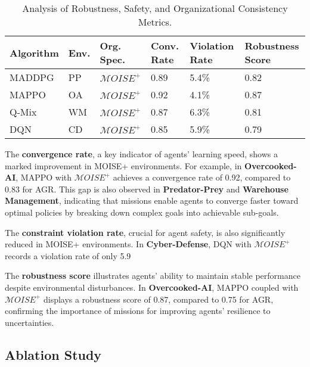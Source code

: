 \documentclass[sigconf,anonymous]{aamas}
\begin{document}
\begin{table}[h!]
    \centering
    \caption{Analysis of Robustness, Safety, and Organizational Consistency Metrics.}
    \label{tab:other_metrics}
    \small %
    \renewcommand{\arraystretch}{1.1}
    \begin{tabular}{p{1.2cm}p{0.5cm}p{1.1cm}p{0.5cm}p{1.4cm}p{1.4cm}}
        \hline
        \textbf{Algorithm} & \textbf{Env.} & \textbf{Org. Spec.} & \textbf{Conv. Rate} & \textbf{Violation Rate} & \textbf{Robustness Score} \\ \hline
        MADDPG & PP & $\mathcal{M}OISE^+$ & 0.89 & 5.4\% & 0.82 \\
        MAPPO & OA & $\mathcal{M}OISE^+$ & 0.92 & 4.1\% & 0.87 \\
        Q-Mix & WM & $\mathcal{M}OISE^+$ & 0.87 & 6.3\% & 0.81 \\
        DQN & CD & $\mathcal{M}OISE^+$ & 0.85 & 5.9\% & 0.79 \\
    \end{tabular}
\end{table}

The \textbf{convergence rate}, a key indicator of agents' learning speed, shows a marked improvement in MOISE+ environments. For example, in \textbf{Overcooked-AI}, MAPPO with $\mathcal{M}OISE^+$ achieves a convergence rate of 0.92, compared to 0.83 for AGR. This gap is also observed in \textbf{Predator-Prey} and \textbf{Warehouse Management}, indicating that missions enable agents to converge faster toward optimal policies by breaking down complex goals into achievable sub-goals.

The \textbf{constraint violation rate}, crucial for agent safety, is also significantly reduced in MOISE+ environments. In \textbf{Cyber-Defense}, DQN with $\mathcal{M}OISE^+$ records a violation rate of only 5.9%

The \textbf{robustness score} illustrates agents' ability to maintain stable performance despite environmental disturbances. In \textbf{Overcooked-AI}, MAPPO coupled with $\mathcal{M}OISE^+$ displays a robustness score of 0.87, compared to 0.75 for AGR, confirming the importance of missions for improving agents' resilience to uncertainties.

\subsection{Ablation Study}
\end{document}
